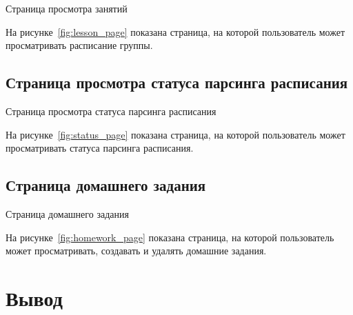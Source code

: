 \begin{image}
    \caption{Страница просмотра занятий}
    \label{fig:lesson_page}
\end{image}

На рисунке~\ref{fig:lesson_page} показана страница,
на которой пользователь может просматривать расписание группы.

\subsection{Страница просмотра статуса парсинга расписания}

\begin{image}
    \caption{Страница просмотра статуса парсинга расписания}
    \label{fig:status_page}
\end{image}

На рисунке~\ref{fig:status_page} показана страница,
на которой пользователь может просматривать статуса парсинга расписания.

\subsection{Страница домашнего задания}

\begin{image}
    \caption{Страница домашнего задания}
    \label{fig:homework_page}
\end{image}

На рисунке~\ref{fig:homework_page} показана страница,
на которой пользователь может просматривать, создавать и удалять
домашние задания.

\clearpage

\section*{\LARGE Вывод}

